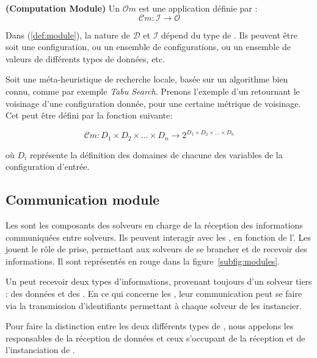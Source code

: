 \begin{definition}\label{def:module} \textbf{(Computation Module)}
Un \om{} $\mathcal{O}m$ est une application définie par :
\begin{equation}
 \mathcal{C}m:\mathcal{I} \rightarrow \mathcal{O}
\end{equation}
\end{definition}

Dans (\ref{def:module}),  la nature de $\mathcal{D}$  et $\mathcal{I}$ dépend du type de \om{}.  Ils peuvent être soit une configuration, ou  un  ensemble de  configurations, ou un ensemble de  valeurs  de différents types de données, etc.

Soit une méta-heuristique de recherche locale, basée sur un algorithme bien connu, comme par exemple {\it Tabu Search}. Prenons l'exemple d'un  \om{} retournant  le voisinage  d'une configuration  donnée, pour une certaine métrique de voisinage. Cet \om{} peut être défini par la fonction suivante:

\begin{equation}
\mathcal{C}m:D_1\times D_2\times\dots\times D_n \rightarrow 2^{D_1\times D_2\times\dots\times D_n}
\end{equation}

où $D_i$  représente  la  définition  des  domaines  de  chacune  des variables de la configuration d'entrée.

\subsection{Communication module}

Les \opchs{} sont  les composants des solveurs en charge  de la réception des informations  communiquées entre  solveurs. Ils  peuvent interagir
avec les  \oms, en fonction de l'\as. Les \opchs{} jouent  le rôle de prise, permettant aux  solveurs de  se  brancher et  de recevoir  des informations. Il sont représentés en rouge dans la figure~\ref{subfig:modules}.

Un \opch{} peut recevoir deux types d'informations, provenant toujours d'un solveur tiers : des données et des \oms. En  ce qui concerne les \oms, leur  communication peut  se faire  via la  transmission d'identifiants permettant à chaque solveur de les instancier.

Pour faire  la distinction entre  les deux différents types  de \opchs, nous appelons \INTROdopch{} les \opchs{} responsables de la réception de données  et \INTROoopch{} ceux s'occupant de la réception et de l'instanciation de \oms.

